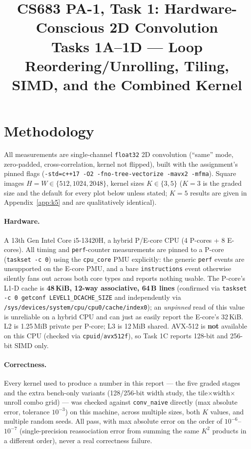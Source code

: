\documentclass[11pt]{article}
\title{CS683 PA-1, Task 1: Hardware-Conscious 2D Convolution \\
       \large Tasks 1A--1D --- Loop Reordering/Unrolling, Tiling, SIMD, and the Combined Kernel}
\author{}
\date{}
\begin{document}
\maketitle

\section*{Methodology}

All measurements are single-channel \texttt{float32} 2D convolution (``same'' mode,
zero-padded, cross-correlation, kernel not flipped), built with the assignment's pinned
flags (\texttt{-std=c++17 -O2 -fno-tree-vectorize -mavx2 -mfma}). Square images
$H{=}W \in \{512, 1024, 2048\}$, kernel sizes $K \in \{3, 5\}$ ($K{=}3$ is the graded
size and the default for every plot below unless stated; $K{=}5$ results are given in
Appendix~\ref{app:k5} and are qualitatively identical).

\paragraph{Hardware.} A 13th Gen Intel Core i5-13420H, a hybrid P/E-core CPU (4 P-cores
+ 8 E-cores). All timing and \texttt{perf}-counter measurements are pinned to a P-core
(\texttt{taskset -c 0}) using the \texttt{cpu\_core} PMU explicitly: the generic
\texttt{perf} events are unsupported on the E-core PMU, and a bare \texttt{instructions}
event otherwise silently fans out across both core types and reports nothing usable. The
P-core's L1-D cache is \textbf{48\,KiB, 12-way associative, 64\,B lines} (confirmed via
\texttt{taskset -c 0 getconf LEVEL1\_DCACHE\_SIZE} and independently via
\texttt{/sys/devices/system/cpu/cpu0/cache/index0}); an \emph{unpinned} read of this
value is unreliable on a hybrid CPU and can just as easily report the E-core's 32\,KiB.
L2 is 1.25\,MiB private per P-core; L3 is 12\,MiB shared. AVX-512 is \textbf{not}
available on this CPU (checked via \texttt{cpuid}/\texttt{avx512f}), so Task 1C reports
128-bit and 256-bit SIMD only.

\paragraph{Correctness.} Every kernel used to produce a number in this report --- the
five graded stages and the extra bench-only variants (128/256-bit width study, the
tile$\times$width$\times$unroll combo grid) --- was checked against \texttt{conv\_naive}
directly (max absolute error, tolerance $10^{-3}$) on this machine, across multiple
sizes, both $K$ values, and multiple random seeds. All pass, with max absolute error on
the order of $10^{-6}$--$10^{-7}$ (single-precision reassociation error from summing the
same $K^2$ products in a different order), never a real correctness failure.
\end{document}

